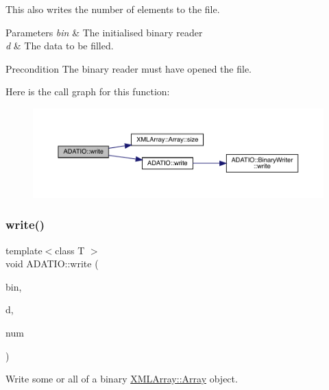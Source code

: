 This also writes the number of elements to the file. 
\begin{DoxyParams}{Parameters}
{\em bin} & The initialised binary reader \\
\hline
{\em d} & The data to be filled.\\
\hline
\end{DoxyParams}
\begin{DoxyPrecond}{Precondition}
The binary reader must have opened the file. 
\end{DoxyPrecond}
Here is the call graph for this function\+:\nopagebreak
\begin{figure}[H]
\begin{center}
\leavevmode
\includegraphics[width=350pt]{d0/dba/namespaceADATIO_a70c8ce102a5eca8961bb57bf7b8b6bd1_cgraph}
\end{center}
\end{figure}
\mbox{\label{namespaceADATIO_a7a09030036bf1cc4704ecdcdf4cd6090}} 
\subsubsection{\texorpdfstring{write()}{write()}\hspace{0.1cm}{\footnotesize\ttfamily [16/25]}}
{\footnotesize\ttfamily template$<$class T $>$ \\
void A\+D\+A\+T\+I\+O\+::write (\begin{DoxyParamCaption}\item[{\mbox{\hyperlink{classADATIO_1_1BinaryWriter}{Binary\+Writer}} \&}]{bin,  }\item[{const \mbox{\hyperlink{classXMLArray_1_1Array}{X\+M\+L\+Array\+::\+Array}}$<$ T $>$ \&}]{d,  }\item[{int}]{num }\end{DoxyParamCaption})\hspace{0.3cm}{\ttfamily [inline]}}



Write some or all of a binary \mbox{\hyperlink{classXMLArray_1_1Array}{X\+M\+L\+Array\+::\+Array}} object. 

